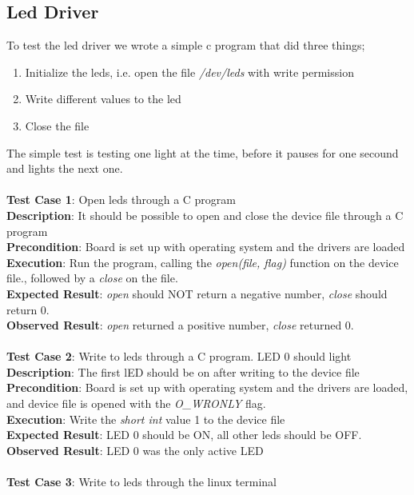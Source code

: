 \subsection{Led Driver}
To test the led driver we wrote a simple c program that did three things;
\begin{enumerate}
  \item Initialize the leds, i.e. open the file \textit{/dev/leds} with write permission
  \item Write different values to the led
  \item Close the file
\end{enumerate}
The simple test is testing one light at the time, before it pauses for one secound and
lights the next one.\\
\\
{\bf Test Case 1}: Open leds through a C program \\
{\bf Description}: It should be possible to open and close the device file through a
C program \\
{\bf Precondition}: Board is set up with operating system and the drivers are loaded\\
{\bf Execution}: Run the program, calling the {\it open(file, flag)} function on the device
file., followed by a {\it close} on the file.\\
{\bf Expected Result}: {\it open} should NOT return a negative number, {\it close}
should return 0.\\
{\bf Observed Result}: {\it open} returned a positive number, {\it close}
returned 0. \\
 \\
{\bf Test Case 2}: Write to leds through a C program. LED 0 should light \\
{\bf Description}: The first lED should be on after writing to the device file \\
{\bf Precondition}: Board is set up with operating system and the drivers are loaded,
and device file is opened with the {\it O\_WRONLY} flag.\\
{\bf Execution}: Write the {\it short int} value 1 to the device file \\
{\bf Expected Result}: LED 0 should be ON, all other leds should be OFF. \\
{\bf Observed Result}: LED 0 was the only active LED \\
 \\
{\bf Test Case 3}: Write to leds through the linux terminal\\
